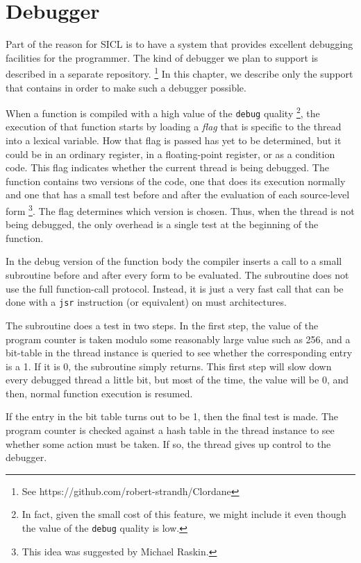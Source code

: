 \chapter{Debugger}
\label{chap-debugger}

Part of the reason for SICL is to have a system that provides
excellent debugging facilities for the programmer.  The kind of
debugger we plan to support is described in a separate repository.%
\footnote{See https://github.com/robert-strandh/Clordane}  In this
chapter, we describe only the support that \sysname{} contains in
order to make such a debugger possible.

When a function is compiled with a high value of the \texttt{debug}
quality%
\footnote{In fact, given the small cost of this feature, we might
  include it even though the value of the \texttt{debug} quality is
  low.},
the execution of that function starts by loading a \emph{flag} that is
specific to the thread into a lexical variable.  How that flag is
passed has yet to be determined, but it could be in an ordinary
register, in a floating-point register, or as a condition code.  This
flag indicates whether the
current thread is being debugged.  The function contains two versions
of the code, one that does its execution normally and one that has a
small test before and after the evaluation of each source-level form%
\footnote{This idea was suggested by Michael Raskin.}.
The flag determines which version is chosen.  Thus, when the thread is
not being debugged, the only overhead is a single test at the
beginning of the function.

In the debug version of the function body the compiler inserts a call
to a small subroutine before and after every form to be evaluated.
The subroutine does not use the full \commonlisp{} function-call
protocol.  Instead, it is just a very fast call that can be done with
a \texttt{jsr} instruction (or equivalent) on must architectures.

The subroutine does a test in two steps.  In the first step, the value
of the program counter is taken modulo some reasonably large value
such as 256, and a bit-table in the thread instance is queried to see
whether the corresponding entry is a 1.  If it is 0, the subroutine
simply returns.  This first step will slow down every debugged thread
a little bit, but most of the time, the value will be 0, and then,
normal function execution is resumed.

If the entry in the bit table turns out to be 1, then the final test
is made.  The program counter is checked against a hash table in the
thread instance to see whether some action must be taken.  If so, the
thread gives up control to the debugger.



